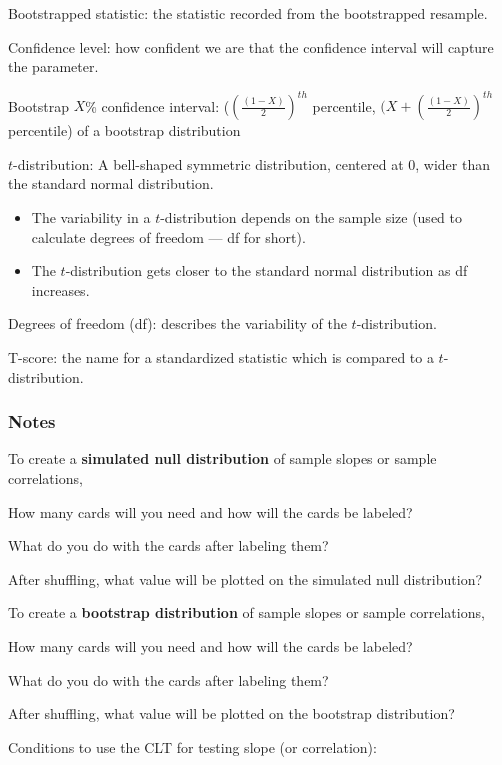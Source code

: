 \documentclass[
]{report}
\providecommand{\tightlist}{%
  \setlength{\itemsep}{0pt}\setlength{\parskip}{0pt}}
\newcommand{\rgs}{\vspace{12pt}} %
\newcommand{\rgi}{\hspace{24pt}}  %
\begin{document}
Bootstrapped statistic: the statistic recorded from the bootstrapped resample.

Confidence level: how confident we are that the confidence interval will capture the parameter.

Bootstrap \(X\)\% confidence interval: (\((\frac{(1-X)}{2})^{th}\) percentile, \((X+(\frac{(1-X)}{2})^{th}\) percentile) of a bootstrap distribution

\(t\)-distribution: A bell-shaped symmetric distribution, centered at 0, wider than the standard normal distribution.

\begin{itemize}
\tightlist
\item
  The variability in a \(t\)-distribution depends on the sample size (used to calculate degrees of freedom --- df for short).
\item
  The \(t\)-distribution gets closer to the standard normal distribution as df increases.
\end{itemize}

Degrees of freedom (df): describes the variability of the \(t\)-distribution.

T-score: the name for a standardized statistic which is compared to a \(t\)-distribution.

\hypertarget{notes-5}{%
\subsubsection*{Notes}\label{notes-5}}

To create a \textbf{simulated null distribution} of sample slopes or sample correlations,

\rgi How many cards will you need and how will the cards be labeled?
\rgs

\rgi What do you do with the cards after labeling them?
\rgs

\rgi After shuffling, what value will be plotted on the simulated null distribution?
\rgs

To create a \textbf{bootstrap distribution} of sample slopes or sample correlations,

\rgi How many cards will you need and how will the cards be labeled?
\rgs

\rgi What do you do with the cards after labeling them?
\rgs

\rgi After shuffling, what value will be plotted on the bootstrap distribution?
\rgs

Conditions to use the CLT for testing slope (or correlation):
\end{document}
